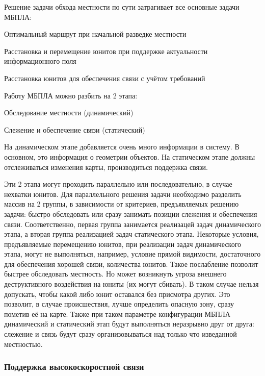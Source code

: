 Решение задачи обхода местности по сути затрагивает все основные задачи
МБПЛА:

\begin{mintemize}
\item Оптимальный маршрут при начальной разведке местности
\item Расстановка и перемещение юнитов при поддержке
    актуальности информационного поля
\item Расстановка юнитов для обеспечения связи с учётом требований
\end{mintemize}

Работу МБПЛА можно разбить на 2 этапа:
\begin{mintemize}
\item Обследование местности (динамический)
\item Слежение и обеспечение связи (статический)
\end{mintemize}

На динамическом этапе добавляется очень много информации в систему.
В основном, это информация о геометрии объектов. На статическом этапе
должны отслеживаться изменения карты, производиться поддержка связи.

Эти 2 этапа могут проходить параллельно или последовательно, в случае
нехватки юнитов. Для параллельного решения задачи необходимо разделить
массив на 2 группы, в зависимости от критериев, предъявляемых 
решению задачи: быстро обследовать или сразу занимать позиции слежения и 
обеспечения связи. Соответственно, первая группа занимается реализацей
задач динамического этапа, а вторая группа реализацией задач
статического этапа. Некоторые условия, предъявляемые перемещению юнитов,
при реализации задач динамического этапа, могут не выполняться, например,
условие прямой видимости, достаточного для обеспечения хорошей связи,
количества юнитов. Такое послабление позволит быстрее обследовать
местность. Но может возникнуть угроза внешнего деструктивного воздействия
на юниты (их могут сбивать). В таком случае нельзя допускать, чтобы 
какой либо юнит оставался без присмотра других. Это позволит, в случае
происшествия, лучше определить опасную зону, сразу пометив её на карте.
Также при таком параметре конфигурации МБПЛА динамический и статический
этап будут выполняться неразрывно друг от друга: слежение и связь будут
сразу организовываться над только что изведанной местностью.

\subsubsection{Поддержка высокоскоростной связи}


